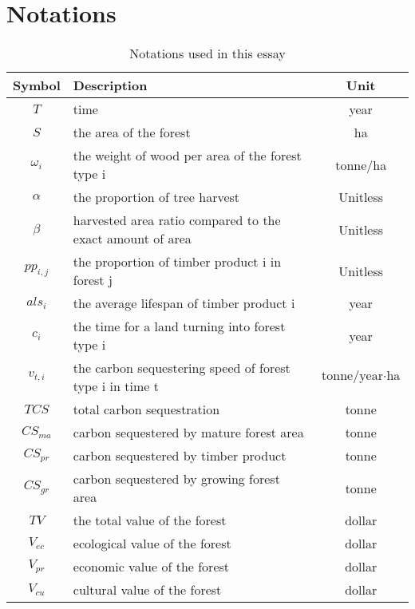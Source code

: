 \section{Notations}
\begin{table}[H]
  \centering
  \caption{Notations used in this essay}
  \label{Notation}
  \begin{tabular*}{\hsize}{@{\extracolsep{\fill}}clc}
    \toprule
    Symbol & Description & Unit \\
    \midrule
    $T$ & time & year  \\
    $S$ & the area of the forest & ha \\
    $\omega_i$ & the weight of wood per area of the forest type i & tonne/ha \\
    $\alpha$ & the proportion of tree harvest & Unitless\\
     $\beta$ & harvested area ratio compared to the exact amount of area& Unitless\\
    $pp_{i,j}$ & the proportion of timber product i in forest j  & Unitless \\
    $als_i$ & the average lifespan of timber product i & year\\
    $c_i$ & the time for a land turning into forest type i & year \\
    $v_{t, i}$ & the carbon sequestering speed of forest type i in time t & $\text{tonne/year} \cdot \text{ha}$ \\
    $TCS$ & total carbon sequestration & tonne \\
    $CS_{ma}$ & carbon sequestered by mature forest area & tonne \\
    $CS_{pr}$ & carbon sequestered by timber product & tonne \\
    $CS_{gr}$ & carbon sequestered by growing forest area& tonne \\
    $TV$ & the total value of the forest & dollar \\
    $V_{ec}$ & ecological value of the forest & dollar\\
    $V_{pr}$ & economic value of the forest & dollar \\
    $V_{cu}$ & cultural value of the forest & dollar\\    
    \bottomrule
  \end{tabular*}
\end{table}

